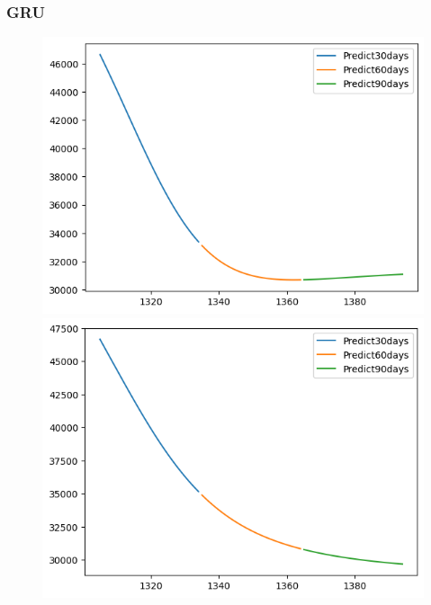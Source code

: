 \subsubsection{GRU}
\begin{figure}[H]
    \centering
    \begin{minipage}{0.15\textwidth}
    \centering
    \includegraphics[width=1\textwidth]{resources/chapter-5/newdata1/predicted/BIDV_GRU_7_3_30days.png}
    \end{minipage}
    \hfill
    \begin{minipage}{0.15\textwidth}
    \centering
    \includegraphics[width=1\textwidth]{resources/chapter-5/newdata1/predicted/BIDV_GRU_8_2_30days.png}
    \end{minipage}

\end{figure}

